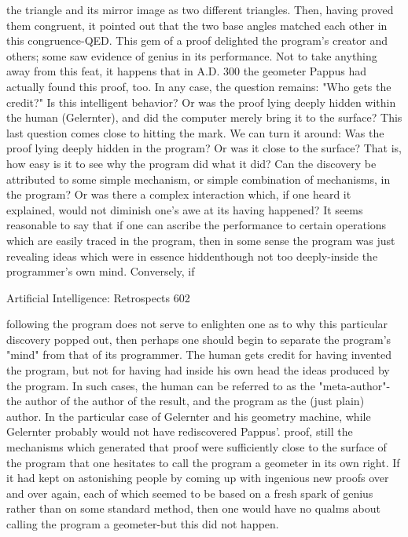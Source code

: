 {     the triangle and its mirror image as two different triangles. Then, having proved
them congruent, it pointed out that the two base angles matched each other in this
congruence-QED.
     This gem of a proof delighted the program's creator and others; some saw evidence
of genius in its performance. Not to take anything away from this feat, it happens that in
A.D. 300 the geometer Pappus had actually found this proof, too. In any case, the
question remains: "Who gets the credit?" Is this intelligent behavior? Or was the proof
lying deeply hidden within the human (Gelernter), and did the computer merely bring it
to the surface? This last question comes close to hitting the mark. We can turn it around:
Was the proof lying deeply hidden in the program? Or was it close to the surface? That is,
how easy is it to see why the program did what it did? Can the discovery be attributed to
some simple mechanism, or simple combination of mechanisms, in the program? Or was
there a complex interaction which, if one heard it explained, would not diminish one's
awe at its having happened?
     It seems reasonable to say that if one can ascribe the performance to certain
operations which are easily traced in the program, then in some sense the program was
just revealing ideas which were in essence hiddenthough not too deeply-inside the
programmer's own mind. Conversely, if




Artificial Intelligence: Retrospects                                                     602

following the program does not serve to enlighten one as to why this particular discovery
popped out, then perhaps one should begin to separate the program's "mind" from that of
its programmer. The human gets credit for having invented the program, but not for
having had inside his own head the ideas produced by the program. In such cases, the
human can be referred to as the "meta-author"-the author of the author of the result, and
the program as the (just plain) author.
     In the particular case of Gelernter and his geometry machine, while Gelernter
probably would not have rediscovered Pappus'. proof, still the mechanisms which
generated that proof were sufficiently close to the surface of the program that one
hesitates to call the program a geometer in its own right. If it had kept on astonishing
people by coming up with ingenious new proofs over and over again, each of which
seemed to be based on a fresh spark of genius rather than on some standard method, then
one would have no qualms about calling the program a geometer-but this did not happen.

}
